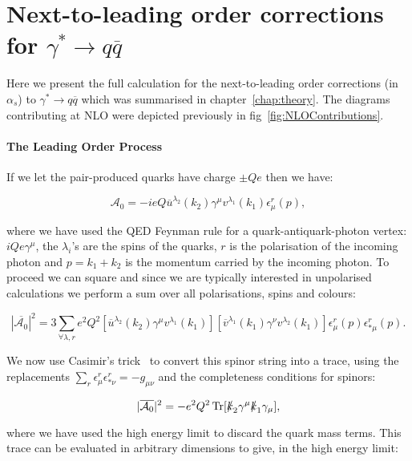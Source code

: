 \chapter{Next-to-leading order corrections for $\gamma^*\to q\overline{q}$}
\label{chap:NLOAppendix}

	Here we present the full calculation for the next-to-leading order corrections (in $\alpha_s$) to
	$\gamma^*\to q\overline{q}$ which was summarised in chapter~\ref{chap:theory}.  The diagrams
	contributing at NLO were depicted previously in fig~\eqref{fig:NLOContributions}.

	\subsubsection{The Leading Order Process}

		If we let the pair-produced quarks have charge $\pm Qe$ then we have:

		\begin{equation}
			\mathcal{A}_0 = -ieQ\overline{u}^{\lambda_2}(k_2)\gamma^\mu v^{\lambda_1}(k_1)\epsilon^r_\mu(p),
		\end{equation}

		where we have used the QED Feynman rule for a quark-antiquark-photon vertex: $iQe\gamma^\mu$, the $\lambda_i$'s are the
		spins of the quarks, $r$ is the polarisation of the incoming photon and $p = k_1 + k_2$ is the momentum carried by the
		incoming photon.  To proceed we can square and since we are typically interested in unpolarised calculations we perform
		a sum over all polarisations, spins and colours:

		\begin{equation}
			|\overline{\mathcal{A}_0}|^2 = 3\sum_{\forall\lambda, r}e^2Q^2[\overline{u}^{\lambda_2}(k_2)\gamma^\mu
			v^{\lambda_1}(k_1)][\overline{v}^{\lambda_1}(k_1)\gamma^\nu v^{\lambda_2}(k_1)]\epsilon^r_\mu(p)\epsilon^r_{*\mu}(p).
		\end{equation}

		We now use Casimir's trick~\cite{griff} to convert this spinor string into a trace, using the replacements
		$\sum_r\epsilon^r_\mu\epsilon^r_{*\nu}=-g_{\mu\nu}$ and the completeness conditions for spinors:

		\begin{equation}
			|\overline{\mathcal{A}_0}|^2 = - e^2Q^2\operatorname{Tr}[\slashed k_2\gamma^\mu\slashed k_1\gamma_\mu],
		\end{equation}

		where we have used the high energy limit to discard the quark mass terms.  This trace can be evaluated in arbitrary
		dimensions to give, in the high energy limit:

